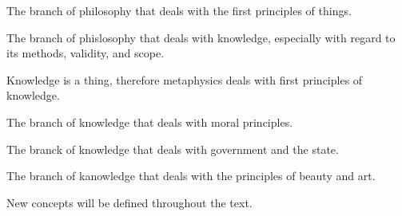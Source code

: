         \begin{definition}[Metaphysics]
        \label{def:metaphysics}
            The branch of philosophy that deals with the first principles of things.
        \end{definition}

        \begin{definition}[Epistemoly]
        \label{def:epistemology}
            The branch of phislosophy that deals with knowledge, especially with regard to its methods, validity, and scope.
        \end{definition}

        \begin{remark}
            Knowledge is a thing, therefore metaphysics deals with first principles of knowledge.
        \end{remark}

        \begin{definition}[Ethics]
        \label{def:ethics}
            The branch of knowledge that deals with moral principles.
        \end{definition}

        \begin{definition}[Politics]
        \label{def:politics}
            The branck of knowledge that deals with government and the state.
        \end{definition}

        \begin{definition}[Aesthetics]
        \label{def:aesthetics}
            The branch of kanowledge that deals with the principles of beauty and art.
        \end{definition}

    New concepts will be defined throughout the text.